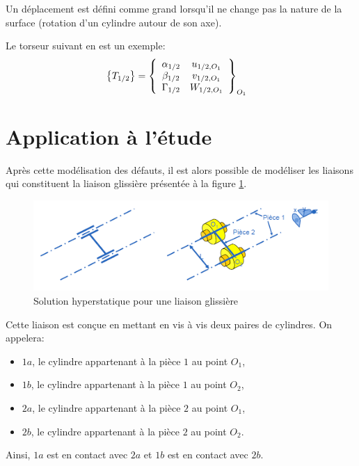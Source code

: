 Un déplacement est défini comme grand lorsqu'il ne change pas la nature de la surface (rotation d'un cylindre autour de son axe).

Le torseur suivant en est un exemple:
\begin{eqnarray}
& \left\{T_{1/2}\right\}=\left\{\begin{array}{c c}
\alpha_{1/2} & u_{1/2,O_{1}} \\
\beta_{1/2} & v_{1/2,O_{1}} \\
\Gamma_{1/2} & W_{1/2,O_{1}}
\end{array}\right\}_{O_{1}}
\end{eqnarray}

\section{Application à l'étude}

Après cette modélisation des défauts, il est alors possible de modéliser les liaisons qui constituent la liaison glissière présentée à la figure \ref{meca_hyp}.

\begin{figure}[h!]
\begin{center}
\includegraphics[width=0.8\linewidth]{img/Fig1.png}
\caption{Solution hyperstatique pour une liaison glissière}
\label{meca_hyp}
\end{center}
\end{figure}

Cette liaison est conçue en mettant en vis à vis deux paires de cylindres. On appelera:
\begin{itemize}
 \item $1a$, le cylindre appartenant à la pièce $1$ au point $O_1$,
 \item $1b$, le cylindre appartenant à la pièce $1$ au point $O_2$,
 \item $2a$, le cylindre appartenant à la pièce $2$ au point $O_1$,
 \item $2b$, le cylindre appartenant à la pièce $2$ au point $O_2$.
\end{itemize}

Ainsi, $1a$ est en contact avec $2a$ et $1b$ est en contact avec $2b$.

